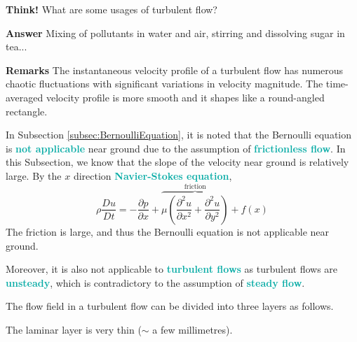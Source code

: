 \documentclass[twoside]{article}
\newcommand{\question}[1]{\begin{questionbox} \emoji{grapes} \textbf{Think!} \newline #1 \end{questionbox}}
\newcommand{\answer}[1]{\begin{answerbox} \emoji{melon} \textbf{Answer} \newline #1 \end{answerbox}}
\newcommand{\remarks}[1]{\begin{remarksbox} \emoji{blueberries} \textbf{Remarks} \newline #1 \end{remarksbox}}
\newcommand{\highlightbluetext}[1]{\textcolor[HTML]{09ACA6}{\textbf{#1}}}
\numberwithin{equation}{section}
\begin{document}
	\question{
		What are some usages of turbulent flow?
	}
	
	\answer{
		Mixing of pollutants in water and air, stirring and dissolving sugar in tea...
	}
	
	\remarks{
		The instantaneous velocity profile of a turbulent flow has numerous chaotic fluctuations with significant variations in velocity magnitude. The time-averaged velocity profile is more smooth and it shapes like a round-angled rectangle.
	}
	
	In Subsection \ref{subsec:BernoulliEquation}, it is noted that the Bernoulli equation is \highlightbluetext{not applicable} near ground due to the assumption of \highlightbluetext{frictionless flow}. In this Subsection, we know that the slope of the velocity near ground is relatively large. By the $x$ direction \highlightbluetext{Navier-Stokes equation},
	\begin{equation*}
		\rho \frac{Du}{Dt} = -\frac{\partial p}{\partial x}+\overbrace{\mu \left( \frac{\partial^2 u}{\partial x^2}+\frac{\partial^2 u}{\partial y^2} \right)}^{\text{friction}}+f(x)
	\end{equation*}
	The friction is large, and thus the Bernoulli equation is not applicable near ground.
	
	Moreover, it is also not applicable to \highlightbluetext{turbulent flows} as turbulent flows are \highlightbluetext{unsteady}, which is contradictory to the assumption of \highlightbluetext{steady flow}.
	
	The flow field in a turbulent flow can be divided into three layers as follows.
	\begin{center}
	\end{center}
	The laminar layer is very thin ($\sim$ a few millimetres).
	
\end{document}
